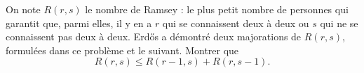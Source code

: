 On note $R(r, s)$ le nombre de Ramsey : le plus petit nombre de personnes qui garantit que, parmi elles, il y en a $r$ qui se connaissent deux à deux ou $s$ qui ne se connaissent pas deux à deux. Erdős a démontré deux majorations de $R(r, s)$, formulées dans ce problème et le suivant. Montrer que
\[ R(r, s) \leq R(r - 1, s) + R(r, s - 1). \tag{1} \]
